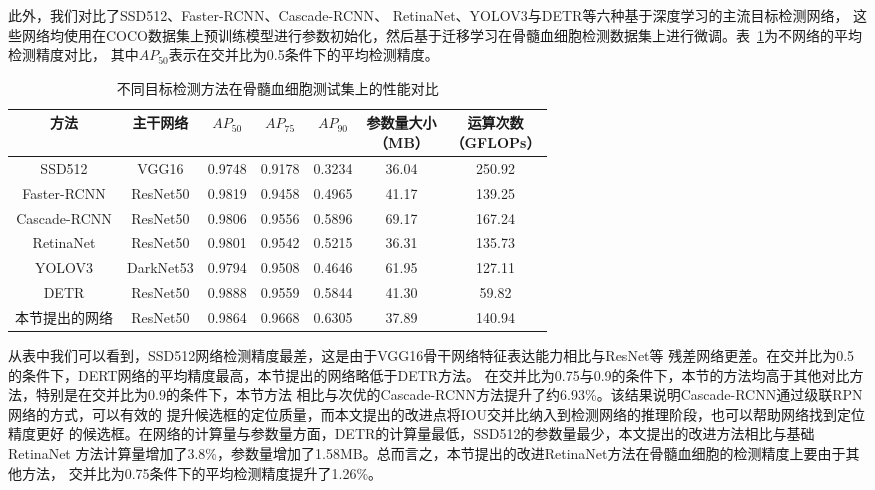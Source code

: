 此外，我们对比了SSD512\cite{liu2016ssd}、Faster-RCNN\cite{ren2015faster}、Cascade-RCNN\cite{cai2018cascade}、
RetinaNet\cite{lin2017focal}、YOLOV3\cite{redmon2018yolov3}与DETR\cite{zhu2020deformable}等六种基于深度学习的主流目标检测网络，
这些网络均使用在COCO数据集上预训练模型进行参数初始化，然后基于迁移学习在骨髓血细胞检测数据集上进行微调。表~\ref{table:cell_det_con}为不网络的平均检测精度对比，
其中$AP_{50}$表示在交并比为0.5条件下的平均检测精度。
\begin{table}[htbp]
  \caption{不同目标检测方法在骨髓血细胞测试集上的性能对比}   
  \centering 
  \label{table:cell_det_con}
  \begin{tabular*}{0.90\hsize}{@{}@{\extracolsep{\fill}}ccccccc@{}}
    \toprule[1pt]
    方法 & 主干网络  &  $AP_{50}$ & $AP_{75}$ & $AP_{90}$ & \makecell{参数量大小\\（MB）} & \makecell{运算次数 \\（GFLOPs）} \\
    \midrule[1pt] 
    SSD512      & VGG16    & 0.9748 & 0.9178 & 0.3234 &  36.04 & 250.92 \\
    Faster-RCNN & ResNet50 & 0.9819 & 0.9458 & 0.4965 &  41.17 & 139.25 \\ 
    Cascade-RCNN & ResNet50 & 0.9806& 0.9556 & 0.5896 & 69.17 & 167.24   \\ 
    RetinaNet   & ResNet50 & 0.9801 & 0.9542 & 0.5215 &  36.31 & 135.73  \\ 
    YOLOV3      & DarkNet53 & 0.9794 & 0.9508 & 0.4646 & 61.95 & 127.11  \\ 
    DETR        & ResNet50 & 0.9888 &  0.9559 & 0.5844 &  41.30 & 59.82  \\ 
    \hline
    本节提出的网络 & ResNet50 & 0.9864 & 0.9668 &  0.6305 & 37.89 & 140.94\\
    \bottomrule[1pt]      
  \end{tabular*} 
\end{table}

从表中我们可以看到，SSD512网络检测精度最差，这是由于VGG16骨干网络特征表达能力相比与ResNet等
残差网络更差。在交并比为0.5的条件下，DERT网络的平均精度最高，本节提出的网络略低于DETR方法。
在交并比为0.75与0.9的条件下，本节的方法均高于其他对比方法，特别是在交并比为0.9的条件下，本节方法 
相比与次优的Cascade-RCNN方法提升了约6.93\%。该结果说明Cascade-RCNN通过级联RPN网络的方式，可以有效的
提升候选框的定位质量，而本文提出的改进点将IOU交并比纳入到检测网络的推理阶段，也可以帮助网络找到定位精度更好
的候选框。在网络的计算量与参数量方面，DETR的计算量最低，SSD512的参数量最少，本文提出的改进方法相比与基础RetinaNet
方法计算量增加了3.8\%，参数量增加了1.58MB。总而言之，本节提出的改进RetinaNet方法在骨髓血细胞的检测精度上要由于其他方法，
交并比为0.75条件下的平均检测精度提升了1.26\%。

